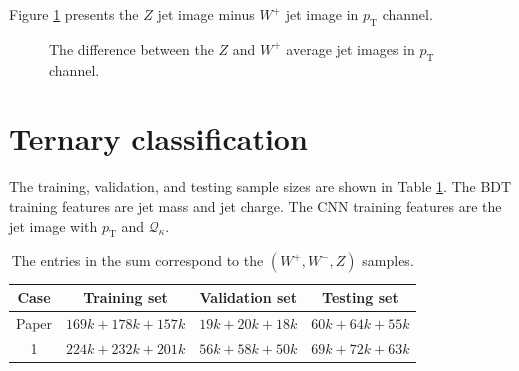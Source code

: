 \documentclass[12pt]{article}
\begin{document}
		Figure \ref{fig:jet_image_PT_Z-W+} presents the $Z$ jet image minus $W^{+}$ jet image in $p_\text{T}$ channel.
		\begin{figure}[htpb]
			\centering
			\caption{The difference between the $Z$ and $W^{+}$ average jet images in $p_\text{T}$ channel.}
			\label{fig:jet_image_PT_Z-W+}
		\end{figure}

\section{Ternary classification}%
\label{sec:ternary_classification}
		The training, validation, and testing sample sizes are shown in Table \ref{tab:sample_size}. The BDT training features are jet mass and jet charge. The CNN training features are the jet image with $p_\text{T}$ and $\mathcal{Q}_\kappa$.
		\begin{table}[htpb]
			\centering
			\caption{The entries in the sum correspond to the $(W^{+}, W^{-}, Z)$ samples.}
			\label{tab:sample_size}
			\begin{tabular}{c|c|c|c}
			Case & Training set     & Validation set & Testing set   \\ \hline
			Paper& $169k+178k+157k$ & $19k+20k+18k$  & $60k+64k+55k$ \\
			1    & $224k+232k+201k$ & $56k+58k+50k$  & $69k+72k+63k$ \\
			\end{tabular}
		\end{table}
\end{document}
